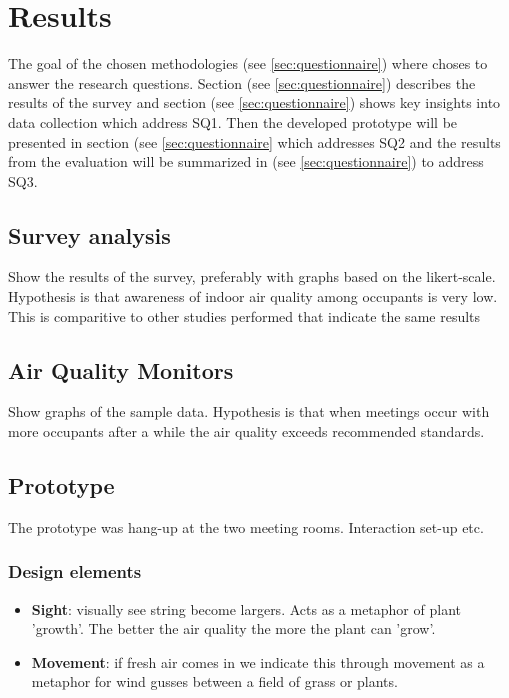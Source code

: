 \section{Results}
\label{sec:results}

The goal of the chosen methodologies (see \ref{sec:questionnaire}) where choses to answer the research questions. Section (see \ref{sec:questionnaire}) describes the results of the survey and section (see \ref{sec:questionnaire}) shows key insights into data collection which address SQ1. Then the developed prototype will be presented in section (see \ref{sec:questionnaire} which addresses SQ2 and the results from the evaluation will be summarized in (see \ref{sec:questionnaire}) to address SQ3.

\subsection{Survey analysis}
Show the results of the survey, preferably with graphs based on the likert-scale. Hypothesis is that awareness of indoor air quality among occupants is very low. This is comparitive to other studies performed that indicate the same results 

\subsection{Air Quality Monitors}

Show graphs of the sample data. Hypothesis is that when meetings occur with more occupants after a while the air quality exceeds recommended standards.

\subsection{Prototype}

The prototype was hang-up at the two meeting rooms. Interaction set-up etc.

\subsubsection{Design elements}

\begin{itemize}
  \item \textbf{Sight}: visually see string become largers. Acts as a metaphor of plant 'growth'. The better the air quality the more the plant can 'grow'.
  \item \textbf{Movement}: if fresh air comes in we indicate this through movement as a metaphor for wind gusses between a field of grass or plants.
\end{itemize}

